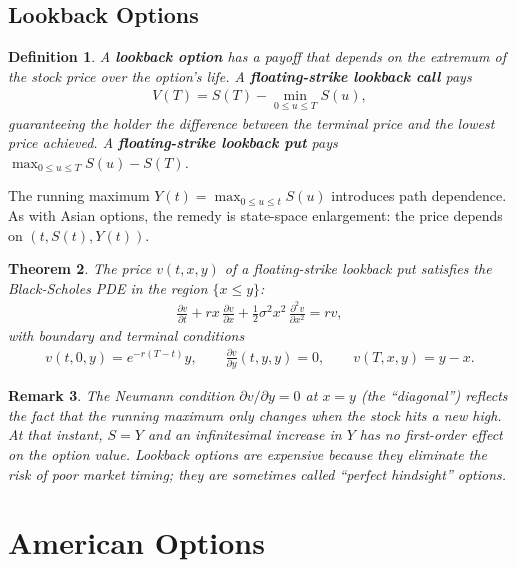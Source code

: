 \documentclass{report}
\theoremstyle{spacedplain}
\newtheorem{theorem}{Theorem}[section]
\theoremstyle{spaceddefinition}
\newtheorem{definition}[theorem]{Definition}
\theoremstyle{spacedremark}
\newtheorem{remark}[theorem]{Remark}
\begin{document}
\subsection{Lookback Options}

\begin{definition}
A \textbf{lookback option} has a payoff that depends on the extremum of the stock price over the option's life. A \textbf{floating-strike lookback call} pays
\begin{align}
    V(T) = S(T) - \min_{0 \leq u \leq T} S(u),
\end{align}
guaranteeing the holder the difference between the terminal price and the lowest price achieved. A \textbf{floating-strike lookback put} pays $\max_{0 \leq u \leq T}S(u) - S(T)$.
\end{definition}

The running maximum $Y(t) = \max_{0 \leq u \leq t} S(u)$ introduces path dependence. As with Asian options, the remedy is state-space enlargement: the price depends on $(t, S(t), Y(t))$.

\begin{theorem}
The price $v(t,x,y)$ of a floating-strike lookback put satisfies the Black-Scholes PDE in the region $\{x \leq y\}$:
\begin{align}
    \frac{\partial v}{\partial t} + rx\,\frac{\partial v}{\partial x} + \frac{1}{2}\sigma^2 x^2\,\frac{\partial^2 v}{\partial x^2} = rv,
\end{align}
with boundary and terminal conditions
\begin{align}
    v(t,0,y) = e^{-r(T-t)}y, \qquad \frac{\partial v}{\partial y}(t,y,y) = 0, \qquad v(T,x,y) = y - x.
\end{align}
\end{theorem}

\begin{remark}
The Neumann condition $\partial v/\partial y = 0$ at $x = y$ (the ``diagonal'') reflects the fact that the running maximum only changes when the stock hits a new high. At that instant, $S = Y$ and an infinitesimal increase in $Y$ has no first-order effect on the option value. Lookback options are expensive because they eliminate the risk of poor market timing; they are sometimes called ``perfect hindsight'' options.
\end{remark}


\section{American Options}
\end{document}
